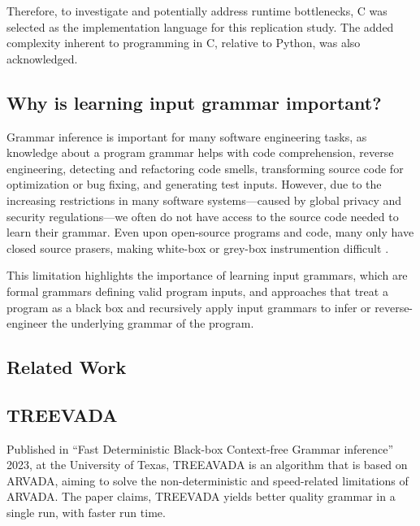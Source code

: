 \vspace{\baselineskip}

Therefore, to investigate and potentially address runtime bottlenecks, C was selected as the implementation language for this replication study. The added complexity inherent to programming in C, relative to Python, was also acknowledged.


\subsection{Why is learning input grammar important?}
Grammar inference is important for many software engineering tasks, as knowledge about a program grammar helps with code comprehension, reverse engineering, detecting and refactoring code smells, transforming source code for optimization or bug fixing, and generating test inputs\cite{arefinFastDeterministicBlackbox2024}. However, due to the increasing restrictions in many software systems—caused by global privacy and security regulations—we often do not have access to the source code needed to learn their grammar.  Even upon open-source programs and code, many only have closed source prasers, making white-box or grey-box instrumention difficult \cite{arefinFastDeterministicBlackbox2024,liIncrementalContextfreeGrammar2024}.

\vspace{\baselineskip}
This limitation highlights the importance of learning input grammars, which are formal grammars defining valid program inputs, and approaches that treat a program as a black box and recursively apply input grammars to infer or reverse-engineer the underlying grammar of the program.


\subsection{Related Work}

\subsection{TREEVADA}

Published in \enquote{Fast Deterministic Black-box Context-free Grammar inference} 2023, at the University of Texas\cite{arefinFastDeterministicBlackbox2024}, TREEAVADA is an algorithm that is based on ARVADA\cite{kulkarniLearningHighlyRecursive2021}, aiming to solve the non-deterministic and speed-related limitations of ARVADA. The paper claims, TREEVADA yields better quality grammar in a single run, with faster run time.

